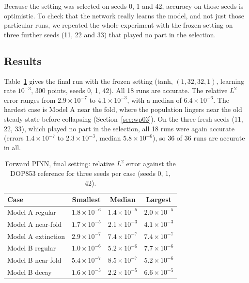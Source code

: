 Because the setting was selected on seeds 0, 1 and 42, accuracy on those seeds is optimistic. To check that the network really learns the model, and not just those particular runs, we repeated the whole experiment with the frozen setting on three further seeds (11, 22 and 33) that played no part in the selection.


\subsection{Results}
\label{sec:forward_results}
Table~\ref{tab:forward_results} gives the final run with the frozen setting (tanh, $(1,32,32,1)$, learning rate $10^{-3}$, 300 points, seeds 0, 1, 42). All 18 runs are accurate. The relative $L^2$ error ranges from $2.9\times10^{-7}$ to $4.1\times10^{-3}$, with a median of $6.4\times10^{-6}$. The hardest case is Model A near the fold, where the population lingers near the old steady state before collapsing (Section~\ref{sec:wp03}). On the three fresh seeds (11, 22, 33), which played no part in the selection, all 18 runs were again accurate (errors $1.4\times10^{-7}$ to $2.3\times10^{-3}$, median $5.8\times10^{-6}$), so 36 of 36 runs are accurate in all.

\begin{table}[ht]
\centering
\caption{Forward PINN, final setting: relative $L^2$ error against the DOP853 reference for three seeds per case (seeds 0, 1, 42).}
\label{tab:forward_results}
\small
\begin{tabular}{lccc}
\toprule
\textbf{Case} & \textbf{Smallest} & \textbf{Median} & \textbf{Largest}\\
\midrule
Model A regular & $1.8\times10^{-6}$ & $1.4\times10^{-5}$ & $2.0\times10^{-5}$\\
Model A near-fold & $1.7\times10^{-5}$ & $2.1\times10^{-3}$ & $4.1\times10^{-3}$\\
Model A extinction & $2.9\times10^{-7}$ & $7.4\times10^{-7}$ & $7.4\times10^{-7}$\\
Model B regular & $1.0\times10^{-6}$ & $5.2\times10^{-6}$ & $7.7\times10^{-6}$\\
Model B near-fold & $5.4\times10^{-7}$ & $8.5\times10^{-7}$ & $5.2\times10^{-6}$\\
Model B decay & $1.6\times10^{-5}$ & $2.2\times10^{-5}$ & $6.6\times10^{-5}$\\
\bottomrule
\end{tabular}
\end{table}

